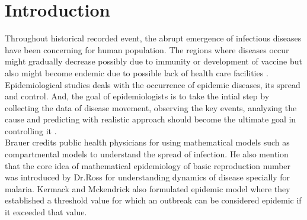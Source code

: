 \documentclass[paper=a4, fontsize=11pt, twoside, BCOR=12mm, parskip=full, listof=totoc]{scrreprt}
\begin{document}
%
\newcommand{\epsSHH}[0]{ ( \frac{\alpha}{\bf{N}} \sum_{k=1}^{\bf N}kP_k ) }
%
%
%
\newcommand{\epsSHHTwo}[0]{(\frac{\alpha}{\bf{2}} P_1+{\alpha} P_2)}
%
\newcommand{\TODO}[1]{\par {\bf \large TODO:} {\texttt #1 }}
\newcommand{\JL}[1]{\par {\bf \tiny remark (jl):} {\tiny \texttt #1 }}

\newcommand{\Note}[1]{\par {\bf \large Note:} {\emph #1 }}

%
%
\newcommand{\charfleq}[1]{{X}_{\{\leq #1\}}}


%
%
\newcommand{\charfgeq}[1]{{X}_{ \{\geq #1 \}}}
%
%
\setcounter{secnumdepth}{4}

\chapter{Introduction}
Throughout historical recorded event, the abrupt emergence of infectious diseases have been concerning for human population\cite{dadlani2020deterministic}. The regions where diseases occur might gradually decrease possibly due to immunity or development of vaccine but also might become endemic due to possible lack of health care facilities \cite{brauer2017mathematical}. Epidemiological studies deals with the occurrence of epidemic diseases, its spread and control\cite{dadlani2020deterministic}. And, the goal of epidemiologists is to take the intial step by collecting the data of disease movement, observing the key events, analyzing the cause and predicting with realistic approach should become the ultimate goal in controlling it \cite{brauer2017mathematical}.\\ 
  
Brauer \cite{brauer2017mathematical} credits public health physicians for using mathematical models such as compartmental models to understand the spread of infection. He also mention that the core idea of mathematical epidemiology of basic reproduction number was introduced by Dr.Ross for understanding dynamics of disease specially for malaria. Kermack and Mckendrick also formulated epidemic model where they established a threshold value for which an outbreak can be considered epidemic if it exceeded that value\cite{hethcote2000mathematics}.\\
\end{document}
